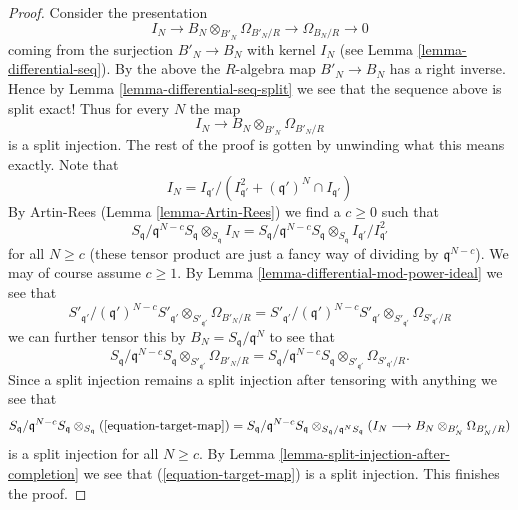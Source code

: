 \documentclass[10pt,a4paper]{amsart}
\theoremstyle{plain}
\theoremstyle{definition}
\theoremstyle{remark}
\numberwithin{equation}{subsection}
\begin{document}
\begin{proof}
\medskip\noindent
Consider the presentation
$$
I_N \to B_N \otimes_{B'_N} \Omega_{B'_N/R} \to \Omega_{B_N/R} \to 0
$$
coming from the surjection $B'_N \to B_N$ with kernel $I_N$ (see
Lemma \ref{lemma-differential-seq}). By the above the $R$-algebra map
$B'_N \to B_N$ has a right inverse. Hence by
Lemma \ref{lemma-differential-seq-split} we see that the sequence above
is split exact! Thus for every $N$ the map
$$
I_N \longrightarrow B_N \otimes_{B'_N} \Omega_{B'_N/R}
$$
is a split injection. The rest of the proof is gotten by unwinding what
this means exactly. Note that
$$
I_N = I_{\mathfrak q'}/
(I_{\mathfrak q'}^2 + (\mathfrak q')^N \cap I_{\mathfrak q'})
$$
By Artin-Rees (Lemma \ref{lemma-Artin-Rees}) we find a $c \geq 0$
such that
$$
S_{\mathfrak q}/\mathfrak q^{N - c}S_{\mathfrak q}
\otimes_{S_{\mathfrak q}} I_N =
S_{\mathfrak q}/\mathfrak q^{N - c}S_{\mathfrak q}
\otimes_{S_{\mathfrak q}}
I_{\mathfrak q'}/I_{\mathfrak q'}^2
$$
for all $N \geq c$
(these tensor product are just a fancy way of dividing by
$\mathfrak q^{N - c}$). We may of course assume $c \geq 1$.
By Lemma \ref{lemma-differential-mod-power-ideal} we see that
$$
S'_{\mathfrak q'}/(\mathfrak q')^{N - c}S'_{\mathfrak q'}
\otimes_{S'_{\mathfrak q'}} \Omega_{B'_N/R} =
S'_{\mathfrak q'}/(\mathfrak q')^{N - c}S'_{\mathfrak q'}
\otimes_{S'_{\mathfrak q'}} \Omega_{S'_{\mathfrak q'}/R}
$$
we can further tensor this by $B_N = S_{\mathfrak q}/\mathfrak q^N$
to see that
$$
S_{\mathfrak q}/\mathfrak q^{N - c}S_{\mathfrak q}
\otimes_{S'_{\mathfrak q'}} \Omega_{B'_N/R} =
S_{\mathfrak q}/\mathfrak q^{N - c}S_{\mathfrak q}
\otimes_{S'_{\mathfrak q'}} \Omega_{S'_{\mathfrak q'}/R}.
$$
Since a split injection remains a split injection after tensoring
with anything we see that
$$
S_{\mathfrak q}/\mathfrak q^{N - c}S_{\mathfrak q}
\otimes_{S_{\mathfrak q}}
(\ref{equation-target-map}) =
S_{\mathfrak q}/\mathfrak q^{N - c}S_{\mathfrak q}
\otimes_{S_{\mathfrak q}/\mathfrak q^N S_{\mathfrak q}}
(I_N \longrightarrow B_N \otimes_{B'_N} \Omega_{B'_N/R})
$$
is a split injection for all $N \geq c$. By
Lemma \ref{lemma-split-injection-after-completion} we see that
(\ref{equation-target-map}) is a split injection. This finishes the proof.
\end{proof}



\end{document}
